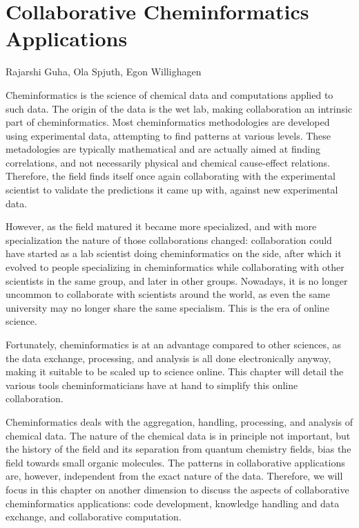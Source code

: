 \documentclass[11pt]{book}
\begin{document}
\chapter{Collaborative Cheminformatics Applications}

\begin{LARGE}
Rajarshi Guha, Ola Spjuth, Egon Willighagen
\end{LARGE}
\vspace{1.5cm}

Cheminformatics is the science of chemical data and computations applied to such
data.  The
origin of the data is the wet lab, making collaboration an intrinsic
part of cheminformatics. Most cheminformatics methodologies are
developed using experimental data, attempting to find patterns at various
levels. These metadologies are typically mathematical and are
actually aimed at finding correlations, and not necessarily physical and chemical
cause-effect relations. Therefore, the field finds itself once
again collaborating with the experimental scientist to validate
the predictions it came up with, against new experimental data.

However, as the field matured it became more specialized,
and with more specialization the nature of those collaborations
changed: collaboration could have started as a lab scientist doing
cheminformatics on the side, after which it evolved to people
specializing in cheminformatics while collaborating with other
scientists in the same group, and later in other groups. Nowadays, it
is no longer uncommon to collaborate with scientists around the world,
as even the same university may no longer share the same
specialism. This is the era of online science.

Fortunately, cheminformatics is at an advantage compared to
other sciences, as the data exchange, processing, and analysis
is all done electronically anyway, making it suitable to be
scaled up to science online. This chapter will detail the
various tools cheminformaticians have at hand to simplify
this online collaboration.

Cheminformatics deals with the aggregation, handling, processing, and
analysis of chemical data. The nature of the chemical data is in principle
not important, but the history of the field and its separation from
quantum chemistry fields, bias the field towards small organic molecules.
The patterns in collaborative applications are, however, independent from
the exact nature of the data. Therefore, we will focus in this chapter
on another dimension to discuss the aspects of collaborative
cheminformatics applications: code development, knowledge handling
and data exchange, and collaborative computation.
\end{document}
